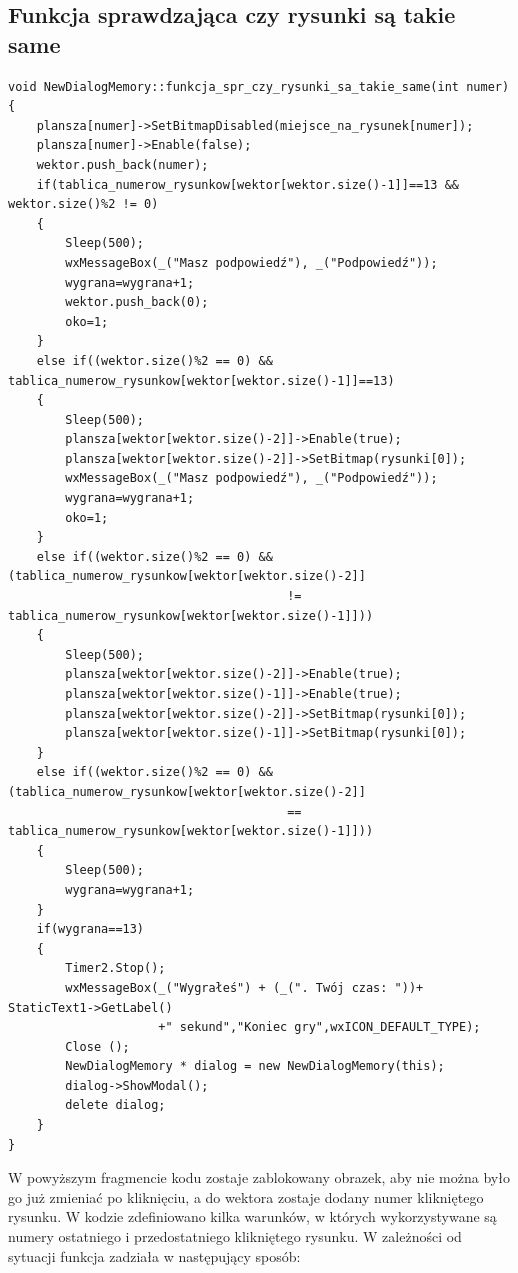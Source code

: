 \documentclass[a4paper]{article}
\begin{document}
\subsection{Funkcja sprawdzająca czy rysunki są takie same}
\begin{verbatim}
void NewDialogMemory::funkcja_spr_czy_rysunki_sa_takie_same(int numer)
{
    plansza[numer]->SetBitmapDisabled(miejsce_na_rysunek[numer]);
    plansza[numer]->Enable(false);
    wektor.push_back(numer);
    if(tablica_numerow_rysunkow[wektor[wektor.size()-1]]==13 && wektor.size()%2 != 0)
    {
        Sleep(500);
        wxMessageBox(_("Masz podpowiedź"), _("Podpowiedź"));
        wygrana=wygrana+1;
        wektor.push_back(0);
        oko=1;
    }
    else if((wektor.size()%2 == 0) && tablica_numerow_rysunkow[wektor[wektor.size()-1]]==13)
    {
        Sleep(500);
        plansza[wektor[wektor.size()-2]]->Enable(true);
        plansza[wektor[wektor.size()-2]]->SetBitmap(rysunki[0]);
        wxMessageBox(_("Masz podpowiedź"), _("Podpowiedź"));
        wygrana=wygrana+1;
        oko=1;
    }
    else if((wektor.size()%2 == 0) && (tablica_numerow_rysunkow[wektor[wektor.size()-2]]
                                       != tablica_numerow_rysunkow[wektor[wektor.size()-1]]))
    {
        Sleep(500);
        plansza[wektor[wektor.size()-2]]->Enable(true);
        plansza[wektor[wektor.size()-1]]->Enable(true);
        plansza[wektor[wektor.size()-2]]->SetBitmap(rysunki[0]);
        plansza[wektor[wektor.size()-1]]->SetBitmap(rysunki[0]);
    }
    else if((wektor.size()%2 == 0) && (tablica_numerow_rysunkow[wektor[wektor.size()-2]]
                                       == tablica_numerow_rysunkow[wektor[wektor.size()-1]]))
    {
        Sleep(500);
        wygrana=wygrana+1;
    }
    if(wygrana==13)
    {
        Timer2.Stop();
        wxMessageBox(_("Wygrałeś") + (_(". Twój czas: "))+ StaticText1->GetLabel()
                     +" sekund","Koniec gry",wxICON_DEFAULT_TYPE);
        Close ();
        NewDialogMemory * dialog = new NewDialogMemory(this);
        dialog->ShowModal();
        delete dialog;
    }
}

\end{verbatim}
 W powyższym fragmencie kodu zostaje zablokowany obrazek, aby nie można było go już zmieniać po kliknięciu, a do wektora zostaje dodany numer klikniętego rysunku. W kodzie zdefiniowano kilka warunków, w których wykorzystywane są numery ostatniego i przedostatniego klikniętego rysunku. W zależności od sytuacji funkcja zadziała w następujący sposób:
\end{document}
